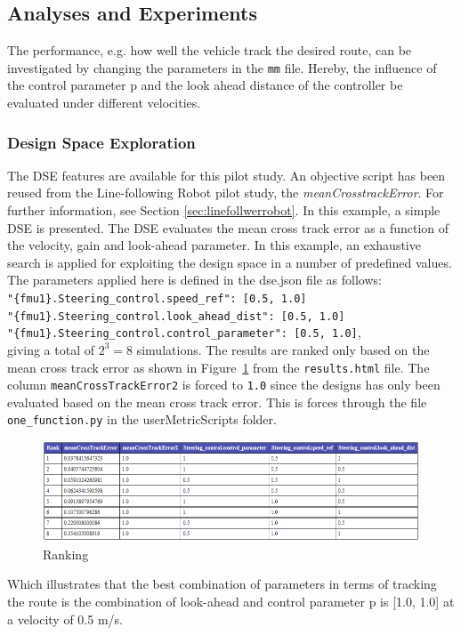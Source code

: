 \subsection{Analyses and Experiments}
The performance, e.g. how well the vehicle track the desired route, can be investigated by changing the parameters in the \texttt{mm} file. Hereby, the influence of the control parameter p and the look ahead distance of the controller be evaluated under different velocities.  
\subsubsection{Design Space Exploration}
The DSE features are available for this pilot study. An objective script has been reused from the Line-following Robot pilot study, the \textit{meanCrosstrackError}. For further information, see Section \ref{sec:linefollwerrobot}. 
In this example, a simple DSE is presented. The DSE evaluates the mean cross track error as a function of the velocity, gain and look-ahead parameter. In this example, an exhaustive search is applied for exploiting the design space in a number of predefined values.
The parameters applied here is defined in the dse.json file as follows:\\
\texttt{"\{fmu1\}.Steering\_control.speed\_ref":  [0.5, 1.0]} \\
\texttt{"\{fmu1\}.Steering\_control.look\_ahead\_dist": [0.5, 1.0]} \\
\texttt{"\{fmu1\}.Steering\_control.control\_parameter": [0.5, 1.0]}, \\
giving a total of $2^3=8$ simulations. The results are ranked only based on the mean cross track error as shown in Figure~\ref{fig:ranking} from the \texttt{results.html} file.  
The column \texttt{mean\-Cross\-Track\-Error2} is forced to \texttt{1.0} since the designs has only been evaluated based on the mean cross track error. This is forces through the file \texttt{one\_function.py} in the userMetricScripts folder. 

\begin{figure}[htbp]
	\begin{center}
		\includegraphics[width=1\textwidth]{vehicle/rank.png}
		\caption{Ranking}
		\label{fig:ranking}
	\end{center}
\end{figure}
Which illustrates that the best combination of parameters in terms of tracking the route is the combination of look-ahead and control parameter p is [1.0, 1.0] at a velocity of 0.5 m/s.

